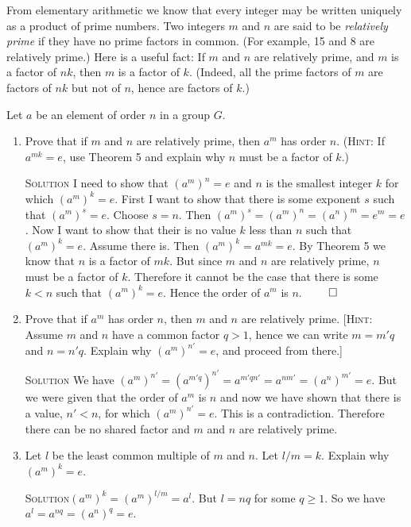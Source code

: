 \documentclass[twoside]{amsart}
\newcommand{\solution}{\textsc{Solution}\xspace}
\newcommand{\blank}{\vspace{5pt}}
\newcommand{\itm}{\blank\item}
\newcommand{\sol}{\blank\noindent\solution}
\begin{document}
\begin{enumerate}[A.]
   \noindent From elementary arithmetic we know that every integer may be
   written uniquely as a product of prime numbers. Two integers $m$ and $n$
   are said to be \emph{relatively prime} if they have no prime factors
   in common. (For example, 15 and 8 are relatively prime.) Here is a 
   useful fact: If $m$ and $n$ are relatively prime, and $m$ is a factor
   of $nk$, then $m$ is a factor of $k$. (Indeed, all the prime factors of 
   $m$ are factors of $nk$ but not of $n$, hence are factors of $k$.)

   \indent Let $a$ be an element of order $n$ in a group $G$.

   \begin{enumerate}[1)]
      \itm Prove that if $m$ and $n$ are relatively prime, then $a^m$ has
      order $n$. (\textsc{Hint}: If $a^{mk} = e$, use Theorem 5 and explain
      why $n$ must be a factor of $k$.)

      \sol I need to show that $(a^m)^n = e$ and $n$ is the smallest
      integer $k$ for which $(a^m)^k = e$. 
      First I want to show that there is some exponent $s$ such
      that $(a^m)^s = e$. Choose $s = n$. Then $(a^m)^s = (a^m)^n =
      (a^n)^m = e^m = e$. Now I want to show that their is no value $k$ 
      less than $n$ such that $(a^m)^k = e$. Assume there is. Then
      $(a^m)^k = a^{mk} = e$. By Theorem 5 we know that $n$ is a factor
      of $mk$. But since $m$ and $n$ are relatively prime, $n$ must
      be a factor of $k$. Therefore it cannot be the case that there
      is some $k < n$ such that $(a^m)^k = e$.
      Hence the order of $a^m$ is $n$. $\qed$

      \itm Prove that if $a^m$ has order $n$, then $m$ and $n$ are relatively
      prime. [\textsc{Hint}: Assume $m$ and $n$ have a common factor $q > 1$,
      hence we can write $m = m'q$ and $n = n'q$. Explain why $(a^m)^{n'} = e$,
      and proceed from there.]

      \sol We have $(a^m)^{n'} = (a^{m'q})^{n'} = a^{m'qn'} = a^{nm'} =
      (a^n)^{m'} = e $. But we were given that the order of $a^m$ is $n$
      and now we have shown that there is a value, $n' < n$, for which
      $(a^m)^{n'} = e$. This is a contradiction. Therefore there can be no
      shared factor and $m$ and $n$ are relatively prime.

      \itm Let $l$ be the least common multiple of $m$ and $n$. Let $l/m = k$.
      Explain why $(a^m)^k = e$.

      \sol $(a^m)^k = (a^m)^{l/m} = a^l$. But $l = nq$ for some $q \ge 1$. So
      we have $a^l = a^{nq} = (a^n)^q = e$.


\end{enumerate}
\end{enumerate}
\end{document}

